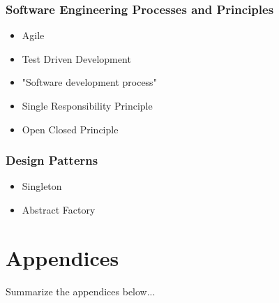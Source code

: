 

\toclineskip
\section{Software Engineering Processes and Principles}

\begin{itemize}
	\item Agile
	\item Test Driven Development
	\item "Software development process"
	\item Single Responsibility Principle
	\item Open Closed Principle
\end{itemize}


\toclineskip
\section{Design Patterns}

\begin{itemize}
	\item Singleton
	\item Abstract Factory
\end{itemize}

\newpage


\part*{Appendices}

Summarize the appendices below...

